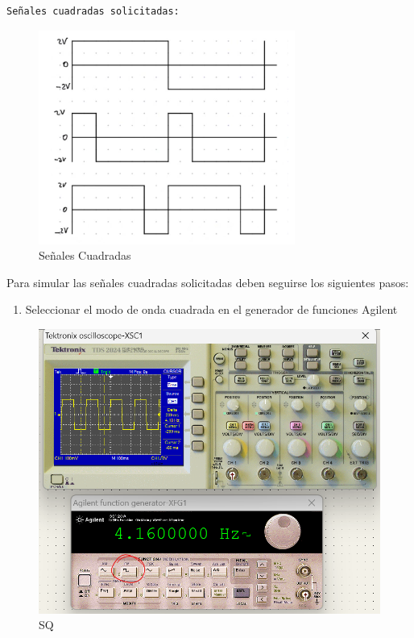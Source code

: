 \documentclass[
]{article}
\providecommand{\tightlist}{%
  \setlength{\itemsep}{0pt}\setlength{\parskip}{0pt}}
\begin{document}
\begin{verbatim}
Señales cuadradas solicitadas:
\end{verbatim}

\begin{figure}
\centering
\includegraphics{images/SQ2.png}
\caption{Señales Cuadradas}
\end{figure}

Para simular las señales cuadradas solicitadas deben seguirse los
siguientes pasos:

\begin{enumerate}
\def\labelenumi{\arabic{enumi}.}
\tightlist
\item
  Seleccionar el modo de onda cuadrada en el generador de funciones
  Agilent
\end{enumerate}

\begin{figure}
\centering
\includegraphics{images/CD1.png}
\caption{SQ}
\end{figure}
\end{document}
